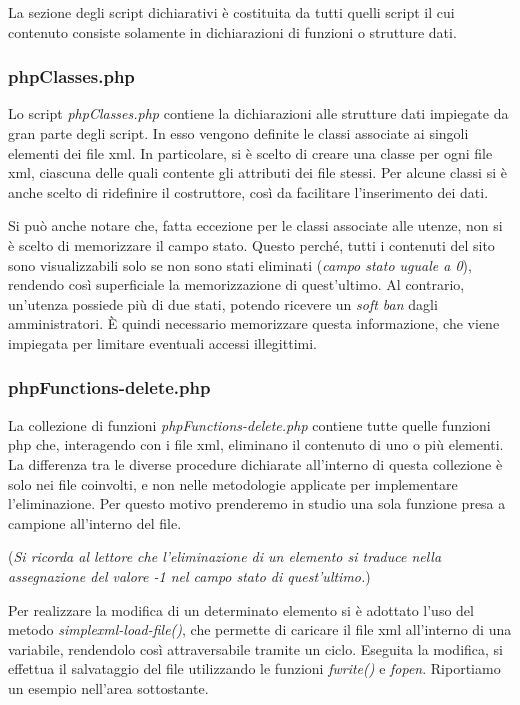 \documentclass [a4paper,11pt]{book}
\begin{document}
La sezione degli script dichiarativi è costituita da tutti quelli script il cui contenuto consiste solamente in dichiarazioni di funzioni o strutture dati. 
\medskip

\subsubsection{phpClasses.php}

Lo script \emph{phpClasses.php} contiene la dichiarazioni alle strutture dati impiegate da gran parte degli script. In esso vengono definite le classi associate ai singoli elementi dei file xml. In particolare, si è scelto di creare una classe per ogni file xml, ciascuna delle quali contente gli attributi dei file stessi. Per alcune classi si è anche scelto di ridefinire il costruttore, così da facilitare l'inserimento dei dati.

Si può anche notare che, fatta eccezione per le classi associate alle utenze, non si è scelto di memorizzare il campo stato. Questo perché, tutti i contenuti del sito sono visualizzabili solo se non sono stati eliminati (\emph{campo stato uguale a 0}), rendendo così superficiale la memorizzazione di quest'ultimo. Al contrario, un'utenza possiede più di due stati, potendo ricevere un \emph{soft ban} dagli amministratori. È quindi necessario memorizzare questa informazione, che viene impiegata per limitare eventuali accessi illegittimi.

\medskip

\subsubsection{phpFunctions-delete.php}

La collezione di funzioni \emph{phpFunctions-delete.php} contiene tutte quelle funzioni php che, interagendo con i file xml, eliminano il contenuto di uno o più elementi. La differenza tra le diverse procedure dichiarate all'interno di questa collezione è solo nei file coinvolti, e non nelle metodologie applicate per implementare l'eliminazione. Per questo motivo prenderemo in studio una sola funzione presa a campione all'interno del file.
\medskip

(\emph{Si ricorda al lettore che l'eliminazione di un elemento si traduce nella assegnazione del valore \emph{-1} nel campo stato di quest'ultimo.})

\medskip

Per realizzare la modifica di un determinato elemento si è adottato l'uso del metodo \emph{simplexml-load-file()}, che permette di caricare il file xml all'interno di una variabile, rendendolo così attraversabile tramite un ciclo. 
Eseguita la modifica, si effettua il salvataggio del file utilizzando le funzioni \emph{fwrite()} e \emph{fopen}. Riportiamo un esempio nell'area sottostante.
\end{document}
